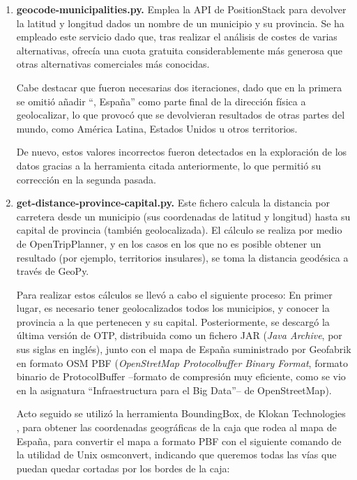 \begin{enumerate}
    \item \textbf{geocode-municipalities.py.} Emplea la API de PositionStack para devolver la latitud y longitud dados un nombre de un municipio y su provincia. Se ha empleado este servicio dado que, tras realizar el análisis de costes de varias alternativas, ofrecía una cuota gratuita considerablemente más generosa que otras alternativas comerciales más conocidas.
    
    Cabe destacar que fueron necesarias dos iteraciones, dado que en la primera se omitió añadir ``, España'' como parte final de la dirección física a geolocalizar, lo que provocó que se devolvieran resultados de otras partes del mundo, como América Latina, Estados Unidos u otros territorios.


    De nuevo, estos valores incorrectos fueron detectados en la exploración de los datos gracias a la herramienta citada anteriormente, lo que permitió su corrección en la segunda pasada.
    
    \item \textbf{get-distance-province-capital.py.} Este fichero calcula la distancia por carretera desde un municipio (sus coordenadas de latitud y longitud) hasta su capital de provincia (también geolocalizada). El cálculo se realiza por medio de OpenTripPlanner, y en los casos en los que no es posible obtener un resultado (por ejemplo, territorios insulares), se toma la distancia geodésica a través de GeoPy.

    Para realizar estos cálculos se llevó a cabo el siguiente proceso: En primer lugar, es necesario tener geolocalizados todos los municipios, y conocer la provincia a la que pertenecen y su capital. Posteriormente, se descargó la última versión de OTP, distribuida como un fichero JAR (\textit{Java Archive}, por sus siglas en inglés), junto con el mapa de España suministrado por Geofabrik \cite{spain_map} en formato OSM PBF (\textit{OpenStretMap Protocolbuffer Binary Format}, formato binario de ProtocolBuffer –formato de compresión muy eficiente, como se vio en la asignatura ``Infraestructura para el Big Data''– de OpenStreetMap).

    Acto seguido se utilizó la herramienta BoundingBox, de Klokan Technologies \cite{klokan}, para obtener las coordenadas geográficas de la caja que rodea al mapa de España, para convertir el mapa a formato PBF con el siguiente comando de la utilidad de Unix osmconvert, indicando que queremos todas las vías que puedan quedar cortadas por los bordes de la caja:


\end{enumerate}
